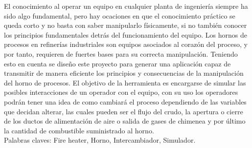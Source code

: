 \documentclass[pregrado]{tesis-usb}
\begin{document}
\frontmatter
\maketitle


\begin{resumen}
     El conocimiento al operar un equipo en cualquier planta de ingeniería siempre ha sido algo fundamental, pero hay ocaciones en que el conocimiento práctico se queda corto y no basta con saber manipularlo físicamente, si no también conocer los principios fundamentales detrás del funcionamiento del equipo. Los hornos de procesos en refinerías industriales son equipos asociados al corazón del proceso, y por tanto, requieren de fuertes bases para su correcta manipulación. Teniendo esto en cuenta se diseño este proyecto para generar una aplicación capaz de transmitir de manera eficiente los principios y consecuencias de la manipulación del horno de procesos. El objetivo de la herramienta es encargarse de simular las posibles interacciones de un operador con el equipo, con su uso los operadores podrán tener una idea de como cambiará el proceso dependiendo de las variables que decidan alterar, las cuales pueden ser el flujo del crudo, la apertura o cierre de los ductos de alimentación de aire o salida de gases de chimenea y por último la cantidad de combustible suministrado al horno. \\
     
     Palabras claves: Fire heater, Horno, Intercambiador, Simulador.
\end{resumen}
\tableofcontents
\listoffigures
\listoftables
\useacronyms


\mainmatter





\nocite{*}

\appendix


\end{document}

